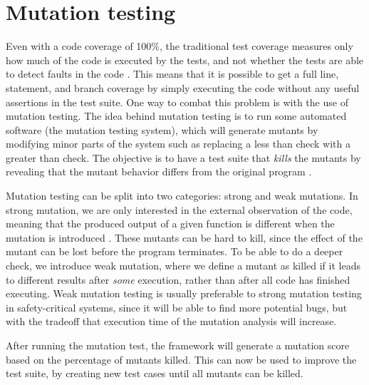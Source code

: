 \section{Mutation testing}
Even with a code coverage of 100\%, the traditional test coverage measures only how much of the code is executed by the tests, and not whether the tests are able to detect faults in the code \cite{pitest}.
This means that it is possible to get a full line, statement, and branch coverage by simply executing the code without any useful assertions in the test suite.
One way to combat this problem is with the use of mutation testing.
The idea behind mutation testing is to run some automated software (the mutation testing system), which will generate mutants by modifying minor parts of the system such as replacing a less than check with a greater than check.
The objective is to have a test suite that \textit{kills} the mutants by revealing that the mutant behavior differs from the original program \cite{mutationtesting}.

Mutation testing can be split into two categories: strong and weak mutations.
In strong mutation, we are only interested in the external observation of the code, meaning that the produced output of a given function is different when the mutation is introduced \cite{mutationtesting}.
These mutants can be hard to kill, since the effect of the mutant can be lost before the program terminates.
To be able to do a deeper check, we introduce weak mutation, where we define a mutant as killed if it leads to different results after \textit{some} execution, rather than after all code has finished executing.
Weak mutation testing is usually preferable to strong mutation testing in safety-critical systems, since it will be able to find more potential bugs, but with the tradeoff that execution time of the mutation analysis will increase.

After running the mutation test, the framework will generate a mutation score based on the percentage of mutants killed.
This can now be used to improve the test suite, by creating new test cases until all mutants can be killed.
